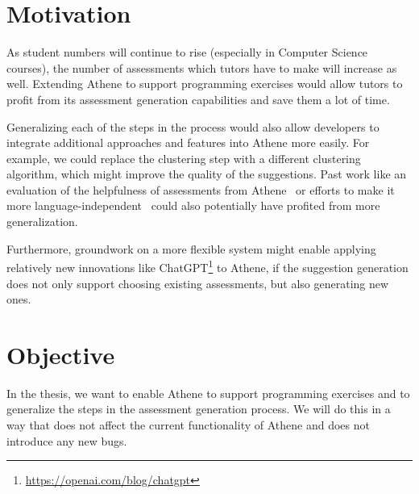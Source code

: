 \section*{Motivation}

As student numbers will continue to rise (especially in Computer Science courses), the number of assessments which tutors have to make will increase as well. Extending Athene to support programming exercises would allow tutors to profit from its assessment generation capabilities and save them a lot of time.

Generalizing each of the steps in the process would also allow developers to integrate additional approaches and features into Athene more easily.
For example, we could replace the clustering step with a different clustering algorithm, which might improve the quality of the suggestions. Past work like an evaluation of the helpfulness of assessments from Athene~\cite{atheneTracking} or efforts to make it more language-independent~\cite{atheneLanguage} could also potentially have profited from more generalization.

Furthermore, groundwork on a more flexible system might enable applying relatively new innovations like ChatGPT\footnote{\url{https://openai.com/blog/chatgpt}} to Athene, if the suggestion generation does not only support choosing existing assessments, but also generating new ones.

\section*{Objective}
In the thesis, we want to enable Athene to support programming exercises and to generalize the steps in the assessment generation process. We will do this in a way that does not affect the current functionality of Athene and does not introduce any new bugs.


